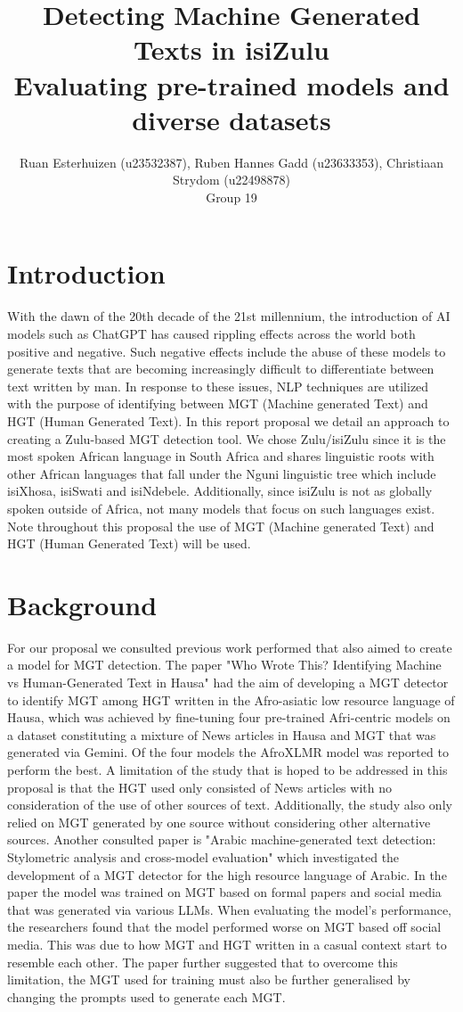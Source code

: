 \documentclass[11pt, a4paper,twocolumn]{article}
\title{Detecting Machine Generated Texts in isiZulu \\[1ex] \large Evaluating pre-trained models and diverse datasets}
\author{Ruan Esterhuizen (u23532387), Ruben Hannes Gadd (u23633353), Christiaan Strydom (u22498878) \\[1ex] \large Group 19}
\date{}
\begin{document}
    \maketitle
    \section{Introduction}
    With the dawn of the 20th decade of the 21st millennium, the introduction of AI models such as ChatGPT has caused rippling 
    effects across the world both positive and negative. Such negative effects include the abuse of these models to 
    generate texts that are becoming increasingly difficult to differentiate between text written by man. In response 
    to these issues, NLP techniques are utilized with the purpose of identifying between MGT (Machine generated Text) and 
    HGT (Human Generated Text). In this report proposal we detail an approach to creating a Zulu-based MGT detection tool. 
    We chose Zulu/isiZulu since it is the most spoken African language in South Africa and shares linguistic roots with other African
    languages that fall under the Nguni linguistic tree which include isiXhosa, isiSwati and isiNdebele. Additionally, since isiZulu is
    not as globally spoken outside of Africa, not many models that focus on such languages exist. Note throughout this proposal the 
    use of MGT (Machine generated Text) and HGT (Human Generated Text) will be used.

    \section{Background}
    For our proposal we consulted previous work performed that also aimed to create a model for MGT detection. The paper "Who Wrote This? 
    Identifying Machine vs Human-Generated Text in Hausa"\citep{hausa} had the aim of developing a MGT detector to identify MGT among HGT written in the 
    Afro-asiatic low resource language of Hausa, which was achieved by fine-tuning four pre-trained Afri-centric models on a dataset constituting 
    a mixture of News articles in Hausa and MGT that was generated via Gemini. Of the four models the AfroXLMR model was reported to perform the best. A 
    limitation of the study that is hoped to be addressed in this proposal is that the HGT used only consisted of News articles with no consideration of 
    the use of other sources of text. Additionally, the study also only relied on MGT generated by one source without considering other alternative sources. 
    Another consulted paper is "Arabic machine-generated text detection: Stylometric analysis and cross-model evaluation"\citep{alshaibani2026arabic} which investigated the development of 
    a MGT detector for the high resource language of Arabic. In the paper the model was trained on MGT based on formal papers and social media that was 
    generated via various LLMs. When evaluating the model's performance, the researchers found that the model performed worse on MGT based off social media. This 
    was due to how MGT and HGT written in a casual context start to resemble each other. The paper further suggested that to overcome this limitation, the MGT used 
    for training must also be further generalised by changing the prompts used to generate each MGT.
\end{document}
